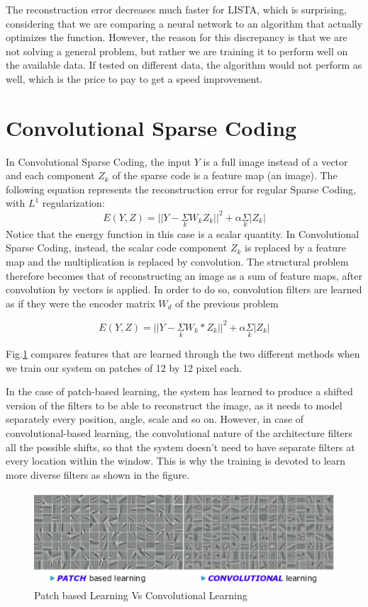 The reconstruction error decreases much faster for LISTA, which is surprising, considering that we are comparing a neural network to an algorithm that actually optimizes the function. However, the reason for this discrepancy is that we are not solving a general problem, but rather we are training it to perform well on the available data. If tested on different data, the algorithm would not perform as well, which is the price to pay to get a speed improvement. 

\section{Convolutional Sparse Coding} 
In Convolutional Sparse Coding, the input $Y$ is a full image instead of a vector and each component $Z_k$ of the sparse code is a feature map (an image). The following equation represents the reconstruction error for regular Sparse Coding, with $L^1$ regularization:
\[E(Y,Z) = ||Y - \underset{k}{\Sigma} W_k Z_k||^2 + \alpha \underset{k}{\Sigma}|Z_k|\]
Notice that the energy function in this case is a scalar quantity. In Convolutional Sparse Coding, instead, the scalar code component $Z_k$ is replaced by a feature map and the multiplication is replaced by convolution. The structural problem therefore becomes that of reconstructing an image as a sum of feature maps, after convolution by vectors is applied. In order to do so, convolution filters are learned as if they were the encoder matrix $W_d$ of the previous problem

\[E(Y,Z) = ||Y - \underset{k}{\Sigma} W_k * Z_k||^2 + \alpha \underset{k}{\Sigma}|Z_k|\]

Fig.\ref{fig:PATCHvCONV} compares features that are learned through the two different methods when we train our system on patches of 12 by 12 pixel each.

In the case of patch-based learning, the system has learned to produce a shifted version of the filters to be able to reconstruct the image, as it needs to model separately every position, angle, scale and so on. However, in case of convolutional-based learning, the convolutional nature of the architecture filters all the possible shifts, so that the system doesn't need to have separate filters at every location within the window. This is why the training is devoted to learn more diverse filters as shown in the figure.

\begin{figure}[H]
  \includegraphics[width=\linewidth]{figs/PATCHvCONV.jpg}
  \caption{Patch based Learning Vs Convolutional Learning}
  \label{fig:PATCHvCONV}
\end{figure}

